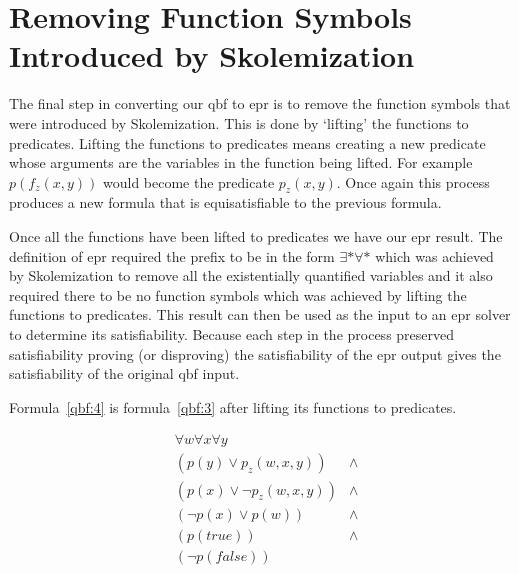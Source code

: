 \section{Removing Function Symbols Introduced by Skolemization}
The final step in converting our \gls{qbf} to \gls{epr} is to remove the function symbols that were introduced by Skolemization. This is done by `lifting' the functions to predicates. Lifting the functions to predicates means creating a new predicate whose arguments are the variables in the function being lifted. For example $p(f_z(x, y))$ would become the predicate $p_z(x, y)$. Once again this process produces a new formula that is equisatisfiable to the previous formula.

Once all the functions have been lifted to predicates we have our \gls{epr} result. The definition of \gls{epr} required the prefix to be in the form $\exists * \forall *$ which was achieved by Skolemization to remove all the existentially quantified variables and it also required there to be no function symbols which was achieved by lifting the functions to predicates. This result can then be used as the input to an \gls{epr} solver to determine its satisfiability. Because each step in the process preserved satisfiability proving (or disproving) the satisfiability of the \gls{epr} output gives the satisfiability of the original \gls{qbf} input.

Formula~\ref{qbf:4} is formula~\ref{qbf:3} after lifting its functions to predicates.

\begin{equation} \label{qbf:4}
\begin{aligned}
&\forall w \forall x \forall y\\
&(p(y) \lor p_z(w, x, y)) &\land\\
&(p(x) \lor \neg p_z(w, x, y)) &\land\\
&(\neg p(x) \lor p(w)) &\land\\
&(p(true)) &\land\\
&(\neg p(false))
\end{aligned}
\end{equation}

